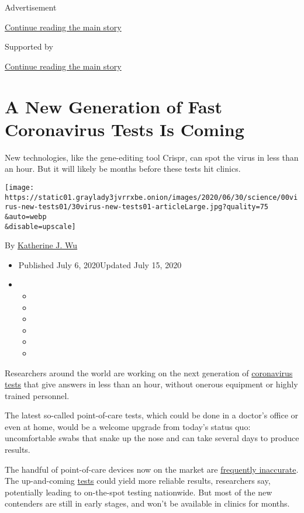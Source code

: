 Advertisement

\protect\hyperlink{after-top}{Continue reading the main story}

Supported by

\protect\hyperlink{after-sponsor}{Continue reading the main story}

\hypertarget{a-new-generation-of-fast-coronavirus-tests-is-coming}{%
\section{A New Generation of Fast Coronavirus Tests Is
Coming}\label{a-new-generation-of-fast-coronavirus-tests-is-coming}}

New technologies, like the gene-editing tool Crispr, can spot the virus
in less than an hour. But it will likely be months before these tests
hit clinics.

\texttt{[image: https://static01.graylady3jvrrxbe.onion/images/2020/06/30/science/00virus-new-tests01/30virus-new-tests01-articleLarge.jpg?quality=75\\\&auto=webp\\\&disable=upscale]}

By
\href{https://www.nytimes3xbfgragh.onion/by/katherine-j--wu}{Katherine
J. Wu}

\begin{itemize}
\item
  Published July 6, 2020Updated July 15, 2020
\item
  \begin{itemize}
  \item
  \item
  \item
  \item
  \item
  \item
  \end{itemize}
\end{itemize}

Researchers around the world are working on the next generation of
\href{https://www.nytimes3xbfgragh.onion/2020/07/15/parenting/kids-covid-19-test.html}{coronavirus
tests} that give answers in less than an hour, without onerous equipment
or highly trained personnel.

The latest so-called point-of-care tests, which could be done in a
doctor's office or even at home, would be a welcome upgrade from today's
status quo: uncomfortable swabs that snake up the nose and can take
several days to produce results.

The handful of point-of-care devices now on the market are
\href{https://www.nytimes3xbfgragh.onion/2020/05/13/health/coronavirus-testing-white-house.html}{frequently
inaccurate}. The up-and-coming
\href{https://www.nytimes3xbfgragh.onion/2020/07/15/parenting/kids-covid-19-test.html}{tests}
could yield more reliable results, researchers say, potentially leading
to on-the-spot testing nationwide. But most of the new contenders are
still in early stages, and won't be available in clinics for months.

